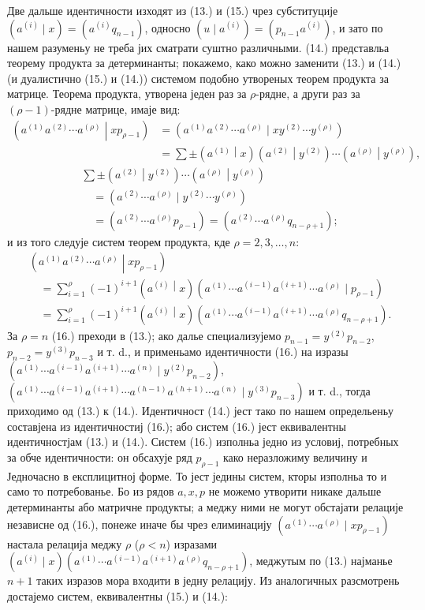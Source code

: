 ﻿\documentclass[11pt]{article}
\newcommand{\pair}[2]{\left(#1\middle|#2\right)}
\begin{document}
Две дальше идентичности изходят из (13.) и (15.) чрез субституције $(a^{(i)}\mid x)=(a^{(i)}q_{n-1})$, односно $(u\mid a^{(i)})=(p_{n-1}a^{(i)})$, и зато по нашем разуменьу не треба јих сматрати суштно различными. (14.) представльа теорему продукта за детерминанты; покажемо, како можно заменити (13.) и (14.) (и дуалистично (15.) и (14.)) системом подобно утвореных теорем продукта за матрице. Теорема продукта, утворена једен раз за $\rho$-рядне, а други раз за $(\rho-1)$-рядне матрице, имаје вид:
\[
\begin{aligned}
\pair{a^{(1)}a^{(2)}\cdots a^{(\rho)}}{xp_{\rho-1}}
&=(a^{(1)}a^{(2)}\cdots a^{(\rho)}\mid xy^{(2)}\cdots y^{(\rho)})\\
&=\sum\pm\pair{a^{(1)}}{x}\pair{a^{(2)}}{y^{(2)}}\cdots\pair{a^{(\rho)}}{y^{(\rho)}},
\end{aligned}
\]
\[
\begin{aligned}
&\sum\pm\pair{a^{(2)}}{y^{(2)}}\cdots\pair{a^{(\rho)}}{y^{(\rho)}}\\
&\quad=(a^{(2)}\cdots a^{(\rho)}\mid y^{(2)}\cdots y^{(\rho)})\\
&\quad=(a^{(2)}\cdots a^{(\rho)}p_{\rho-1})
=(a^{(2)}\cdots a^{(\rho)}q_{n-\rho+1});
\end{aligned}
\]
и из того следује систем теорем продукта, кде $\rho=2,3,\ldots,n$:
\begin{equation}
\begin{aligned}
&\pair{a^{(1)}a^{(2)}\cdots a^{(\rho)}}{xp_{\rho-1}}\\
&\quad=\sum_{i=1}^{\rho}(-1)^{i+1}\pair{a^{(i)}}{x}
(a^{(1)}\cdots a^{(i-1)}a^{(i+1)}\cdots a^{(\rho)}\mid p_{\rho-1})\\
&\quad=\sum_{i=1}^{\rho}(-1)^{i+1}\pair{a^{(i)}}{x}
(a^{(1)}\cdots a^{(i-1)}a^{(i+1)}\cdots a^{(\rho)}q_{n-\rho+1}).
\end{aligned}
\tag{16}
\end{equation}
За $\rho=n$ (16.) преходи в (13.); ако далье специализујемо $p_{n-1}=y^{(2)}p_{n-2}$, $p_{n-2}=y^{(3)}p_{n-3}$ и т. d., и применьамо идентичности (16.) на изразы $(a^{(1)}\cdots a^{(i-1)}a^{(i+1)}\cdots a^{(n)}\mid y^{(2)}p_{n-2})$, $(a^{(1)}\cdots a^{(i-1)}a^{(i+1)}\cdots a^{(h-1)}a^{(h+1)}\cdots a^{(n)}\mid y^{(3)}p_{n-3})$ и т. d., тогда приходимо од (13.) к (14.). Идентичност (14.) јест тако по нашем определьеньу составјена из идентичностиј (16.); або систем (16.) јест еквивалентны идентичностјам (13.) и (14.). Систем (16.) изполньа једно из условиј, потребных за обче идентичности: он обсахује ряд $p_{\rho-1}$ како неразложиму величину и Једночасно в експлицитној форме. То јест једины систем, кторы изполньа то и само то потребованье. Бо из рядов $a,x,p$ не можемо утворити никаке дальше детерминанты або матричне продукты; а меджу ними не могут обстајати релације независне од (16.), понеже иначе бы чрез елиминацију $(a^{(1)}\cdots a^{(\rho)}\mid xp_{\rho-1})$ настала релација меджу $\rho$ ($\rho<n$) изразами $(a^{(i)}\mid x)(a^{(1)}\cdots a^{(i-1)}a^{(i+1)}a^{(\rho)}q_{n-\rho+1})$, меджутым по (13.) најманье $n+1$ таких изразов мора входити в једну релацију. Из аналогичных разсмотрень достајемо систем, еквивалентны (15.) и (14.):
\end{document}
